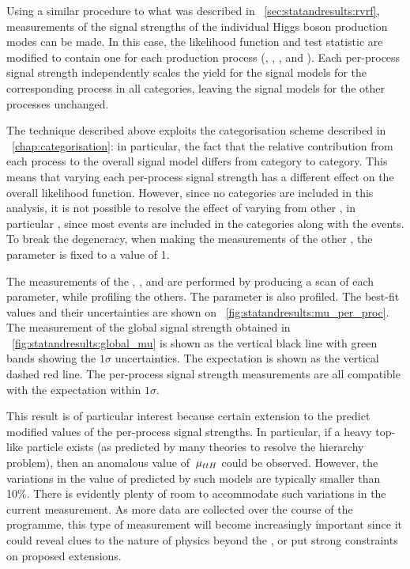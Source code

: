 Using a similar procedure to what was described in \Sec~\ref{sec:statandresults:rvrf}, measurements of the signal strengths of the individual Higgs boson production modes can be made. In this case, the likelihood function and test statistic are modified to contain one \POI for each production process (\muggH, \muVBF, \muVH, and \muttH). Each per-process signal strength independently scales the yield for the signal models for the corresponding process in all categories, leaving the signal models for the other processes unchanged. 

The technique described above exploits the categorisation scheme described in \Chapter~\ref{chap:categorisation}: in particular, the fact that the relative contribution from each process to the overall signal model differs from category to category. This means that varying each per-process signal strength has a different effect on the overall likelihood function. However, since no \VHTag categories are included in this analysis, it is not possible to resolve the effect of varying \muVH from other \POI\s, in particular \muggH, since most \VH events are included in the \Untagged categories along with the \ggH events. To break the degeneracy, when making the measurements of the other \POI\s, the parameter \muVH is fixed to a value of 1. 

The measurements of the \muggH, \muVBF, and \muttH are performed by producing a \DNLL scan of each parameter, while profiling the others. The \mH parameter is also profiled. The best-fit values and their uncertainties are shown on \Fig~\ref{fig:statandresults:mu_per_proc}. The measurement of the global signal strength obtained in \Sec~\ref{fig:statandresults:global_mu} is shown as the vertical black line with green bands showing the $1\sigma$ uncertainties. The \SM expectation is shown as the vertical dashed red line. The per-process signal strength measurements are all compatible with the \SM expectation within $1\sigma$. 

This result is of particular interest because certain extension to the \SM predict modified values of the per-process signal strengths. In particular, if a heavy top-like particle exists (as predicted by many theories to resolve the hierarchy problem), then an anomalous value of $\,\mu_{ttH}$ could be observed. However, the variations in the value of \muttH predicted by such models are typically smaller than 10\%. There is evidently plenty of room to accommodate such variations in the current measurement. As more data are collected over the course of the \LHC programme, this type of measurement will become increasingly important since it could reveal clues to the nature of physics beyond the \SM, or put strong constraints on proposed extensions.

